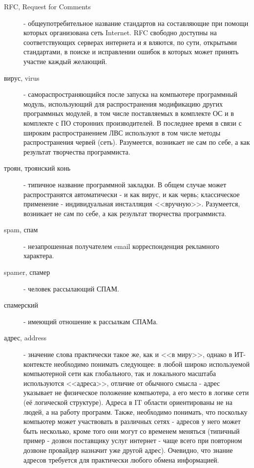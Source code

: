 \begin{description}
\item[RFC, Request for Comments]
 - общеупотребительное название стандартов на составляющие
при помощи которых организована сеть Internet. RFC свободно доступны на соответствующих
серверах интернета и я вляются, по сути, открытыми стандартами, в поиске и исправлении ошибок
в которых может принять участие каждый желающий.

\item[вирус, virus]
 - самораспространяющийся после запуска на компьютере программный
модуль, использующий для распространения модификацию других программных модулей,
в том числе поставляемых в комплекте ОС и в комплекте с ПО сторонних
производителей. В последнее время в связи с широким распространением ЛВС
используют в том числе методы распространения червей (сеть). Разумеется,
возникает не сам по себе, а как результат творчества программиста.

\item[троян, троянский конь]
 - типичное название программной закладки.  В общем случае может
распространятся автоматически - и как вирус, и как червь; классическое
применение - индивидуальная инсталляция <<вручную>>. Разумеется, возникает не
сам по себе, а как результат творчества программиста.

\item[spam, спам]
 - незапрошенная получателем email корреспонденция рекламного характера.

\item[spamer, спамер]
 - человек рассылающий СПАМ.

\item[спамерский]
 - имеющий отношение к рассылкам СПАМа.

\item[адрес, address]
 - значение слова практически такое же, как и <<в миру>>, однако в
ИТ-контексте необходимо понимать следующее: в любой широко используемой
компьютерной сети как глобального, так и локального масштаба используются
<<адреса>>, отличие от обычного смысла - адрес указывает не физическое
положение компьютера, а его место в логике сети (её логической структуре).
Адреса в IT области ориентированы не на людей, а на работу программ.
Также, необходимо понимать, что поскольку компьютер может участвовать в
различных сетях - адресов у него может быть несколько, кроме того они
могут со временем меняться (типичный пример - дозвон поставщику услуг интернет
- чаще всего при повторном дозвоне провайдер назначит уже другой адрес).
Очевидно, что знание адресов требуется для практически любого обмена
информацией.


\end{description}
